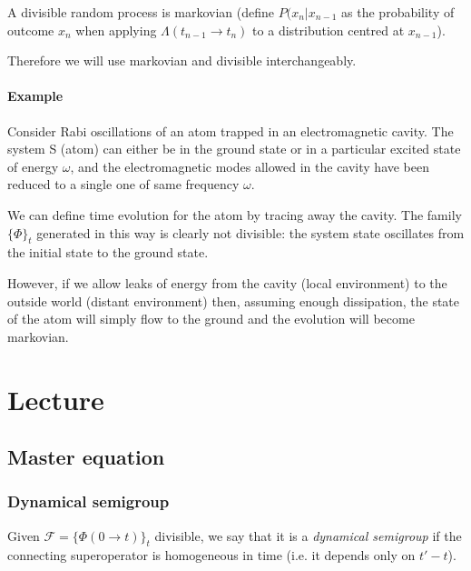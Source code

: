 \documentclass[a4paper, 11pt]{article}
\begin{document}
	A divisible random process is markovian (define $P(x_n|x_{n-1}$ as the probability of outcome $x_n$ when applying $\Lambda(t_{n-1}\rightarrow t_n)$ to a distribution centred at $x_{n-1}$).
	
	Therefore we will use markovian and divisible interchangeably.
	
	\paragraph{Example}
	Consider Rabi oscillations of an atom trapped in an electromagnetic cavity. The system S (atom) can either be in the ground state or in a particular excited state of energy $\omega$, and the electromagnetic modes allowed in the cavity have been reduced to a single one of same frequency $\omega$.
	
	\noindent We can define time evolution for the atom by tracing away the cavity. The family $\{\Phi\}_t$ generated in this way is clearly not divisible: the system state oscillates from the initial state to the ground state.
	
	However, if we allow leaks of energy from the cavity (local environment) to the outside world (distant environment) then, assuming enough dissipation, the state of the atom will simply flow to the ground and the evolution will become markovian.
	
	\section{Lecture}
	\subsection{Master equation}
	\subsubsection{Dynamical semigroup}
	Given $\mathcal{F} = \{\Phi(0\rightarrow t)\}_t$ divisible, we say that it is a \emph{dynamical semigroup} if the connecting superoperator is homogeneous in time (i.e. it depends only on $t'-t$).
	
\end{document}
